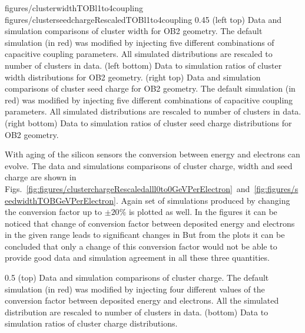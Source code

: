                  {figures/clusterwidthTOBl1to4coupling}
                 {figures/clusterseedchargeRescaledTOBl1to4coupling} %
                 {0.45}       %
                 {(left top) Data and simulation comparisons of cluster width for OB2 geometry. The default simulation (in red) was modified by injecting five different combinations of capacitive coupling parameters. All simulated distributions are rescaled to number of clusters in data. (left bottom) Data to simulation ratios of cluster width distributions for OB2 geometry. (right top) Data and simulation  comparisons of cluster seed charge for OB2 geometry. The default simulation (in red) was modified by injecting five different combinations of capacitive coupling parameters. All simulated distributions are rescaled to number of clusters in data. (right bottom) Data to simulation ratios of cluster seed charge distributions for OB2 geometry. }


With aging of the silicon sensors the conversion between energy and electrons can evolve. The data and simulations comparisons of cluster charge, width and seed charge are shown in Figs.~\ref{fig:figures/clusterchargeRescaledalll0to0GeVPerElectron}~and~\ref{fig:figures/seedwidthTOBGeVPerElectron}. Again set of simulations produced by changing the conversion factor up to $\pm 20\%$ is plotted as well. In the figures it can be noticed that change of conversion factor between deposited energy and electrons in the given range leads to significant changes in  But from the plots it can be concluded that only a change of this conversion factor would not be able to provide good data and simulation agreement in all these three quantities.

                 {0.5}       %
                 { (top) Data and simulation comparisons of cluster charge. The default simulation (in red) was modified by injecting four different values of the conversion factor between deposited energy and electrons. All the simulated distribution are rescaled to number of clusters in data. (bottom) Data to simulation ratios of cluster charge distributions. }

